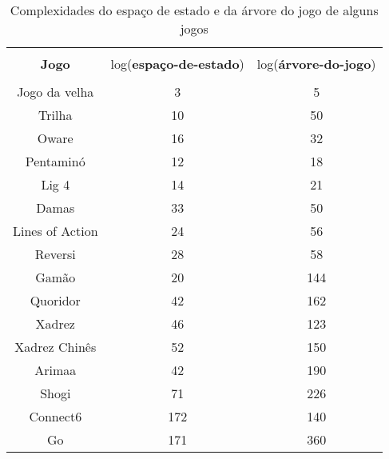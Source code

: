 \begin{table}
  \begin{center}
    \begin{tabular}{|c|c|c|}
      \hline
                        &                              &                      \\
 \textbf{Jogo} & log(\textbf{espaço-de-estado}) & log(\textbf{árvore-do-jogo})\\
                        &                              &                      \\
      \hline
        Jogo da velha   &             3               &          5           \\
      \hline
        Trilha          &             10              &          50          \\
      \hline
        Oware           &             16              &          32          \\
      \hline
        Pentaminó       &             12              &          18          \\
      \hline
        Lig 4           &             14              &          21          \\
      \hline
        Damas           &             33              &          50          \\
      \hline
        Lines of Action &             24              &          56          \\
      \hline
        Reversi         &             28              &          58          \\
      \hline
        Gamão           &             20              &          144         \\
      \hline
        Quoridor        &             42              &          162         \\
      \hline
        Xadrez          &             46              &          123         \\
      \hline
        Xadrez Chinês   &             52              &          150         \\
      \hline
        Arimaa          &             42              &          190         \\
      \hline
        Shogi           &             71              &          226         \\
      \hline
        Connect6        &             172             &          140         \\
      \hline
        Go              &             171             &          360         \\
      \hline
    \end{tabular}
    \caption{Complexidades do espaço de estado e da árvore do jogo de alguns
             jogos \cite{mertens2006quoridor}}
  \label{table:games}
  \end{center}
\end{table}


